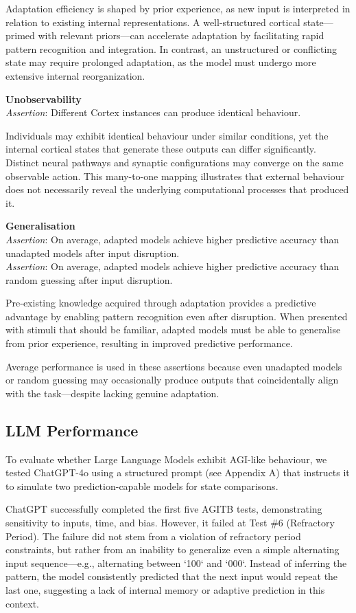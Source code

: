 \documentclass{article}
\newcommand{\agitbtest}[2]{
 \item \textbf{#1} \\
 #2
}
\begin{document}
\begin{agitblist}
{Adaptation efficiency is shaped by prior experience, as new input is interpreted in relation to existing internal representations. A well-structured cortical state—primed with relevant priors—can accelerate adaptation by facilitating rapid pattern recognition and integration. In contrast, an unstructured or conflicting state may require prolonged adaptation, as the model must undergo more extensive internal reorganization.
}
\agitbtest{Unobservability}{
\emph{Assertion}: Different Cortex instances can produce identical behaviour.

Individuals may exhibit identical behaviour under similar conditions, yet the internal cortical states that generate these outputs can differ significantly. Distinct neural pathways and synaptic configurations may converge on the same observable action. This many-to-one mapping illustrates that external behaviour does not necessarily reveal the underlying computational processes that produced it.
}
\agitbtest{Generalisation}{
\emph{Assertion}: On average, adapted models achieve higher predictive accuracy than unadapted models after input disruption.\\
\emph{Assertion}: On average, adapted models achieve higher predictive accuracy than random guessing after input disruption.

Pre-existing knowledge acquired through adaptation provides a predictive advantage by enabling pattern recognition even after disruption. When presented with stimuli that should be familiar, adapted models must be able to generalise from prior experience, resulting in improved predictive performance.

Average performance is used in these assertions because even unadapted models or random guessing may occasionally produce outputs that coincidentally align with the task—despite lacking genuine adaptation.
}

\end{agitblist}

\subsection{LLM Performance}

To evaluate whether Large Language Models exhibit AGI-like behaviour, we tested ChatGPT-4o using a structured prompt (see Appendix A) that instructs it to simulate two prediction-capable models for state comparisons.

ChatGPT successfully completed the first five AGITB tests, demonstrating sensitivity to inputs, time, and bias. However, it failed at Test \#6 (Refractory Period). The failure did not stem from a violation of refractory period constraints, but rather from an inability to generalize even a simple alternating input sequence—e.g., alternating between `100` and `000`. Instead of inferring the pattern, the model consistently predicted that the next input would repeat the last one, suggesting a lack of internal memory or adaptive prediction in this context.
\end{document}
